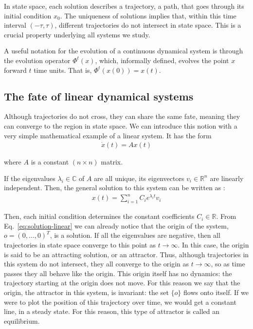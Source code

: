In state space, each solution describes a trajectory, a path, that goes through its initial condition $x_0$. The uniqueness of solutions implies that, within this time interval $(-\tau, \tau)$, different trajectories do not intersect in state space. This is a crucial property underlying all systems we study. 

A useful notation for the evolution of a continuous dynamical system is through the evolution operator $\Phi^t(x)$, which, informally defined, evolves the point $x$ forward $t$ time units. That is, $\Phi^t(x(0)) = x(t)$.

\subsection{The fate of linear dynamical systems}
Although trajectories do not cross, they can share the same fate, meaning they can converge to the region in state space. We can introduce this notion with a very simple mathematical example of a linear system. It has the form
% 
\begin{align}
    \dot{x}(t) = A x(t)
\end{align}

where $A$ is a constant $(n \times n)$ matrix. %

If the eigenvalues $\lambda_i \in \mathbb{C}$ of $A$ are all unique, its eigenvectors $v_i \in \mathbb{R}^n$ are linearly independent. Then, the general solution to this system can be written as \cite{strogatz2002nonlinear}:
%
\begin{align}\label{eq:solution-linear}
    x(t) = \sum_{i=1}^n C_i e^{\lambda_i t} v_i
\end{align}

Then, each initial condition determines the constant coefficients $C_i \in \mathbb{R}$. 
From Eq.~\ref{eq:solution-linear} we can already notice that the origin of the system, $ o = (0, \ldots, 0)^T$, is a solution. If all the eigenvalues are negative, then all trajectories in state space converge to this point as $t \to \infty$. In this case, the origin is said to be an attracting solution, or an attractor. Thus, although trajectories in this system do not intersect, they all converge to the origin as $t \to \infty$, so as time passes they all behave like the origin. This origin itself has no dynamics: the trajectory starting at the origin does not move. For this reason we say that the origin, the attractor in this system, is invariant: the set $\{o\}$ flows onto itself. If we were to plot the position of this trajectory over time, we would get a constant line, in a steady state. For this reason, this type of attractor is called an equilibrium.   



